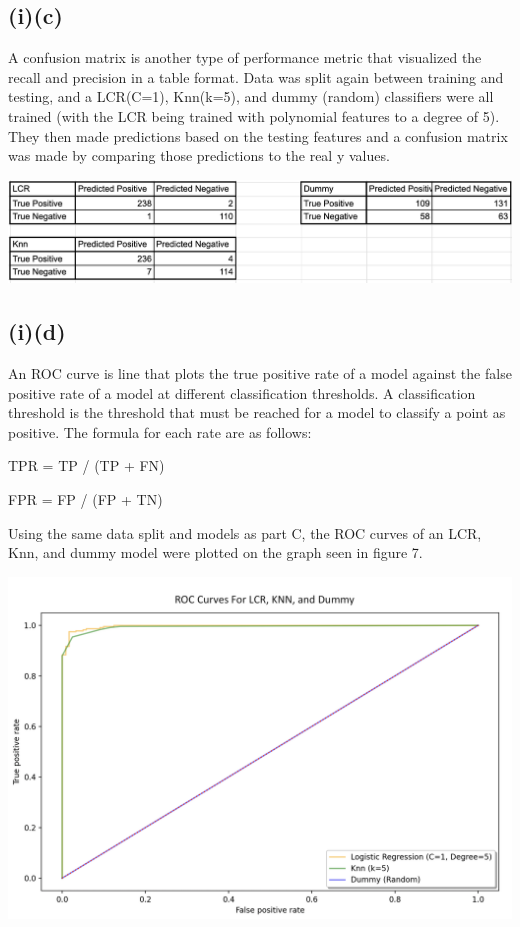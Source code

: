 \documentclass{article}
\begin{document}
\subsection{(i)(c)}
A confusion matrix is another type of performance metric that visualized the recall and precision in a table format. Data was split again between training and testing, and a LCR(C=1), Knn(k=5), and dummy (random) classifiers were all trained (with the LCR being trained with polynomial features to a degree of 5). They then made predictions based on the testing features and a confusion matrix was made by comparing those predictions to the real y values.

\begin{center}
\includegraphics[width=\linewidth]{confusion.png}
\end{center}

\subsection{(i)(d)}
An ROC curve is line that plots the true positive rate of a model against the false positive rate of a model at different classification thresholds. A classification threshold is the threshold that must be reached for a model to classify a point as positive. The formula for each rate are as follows:
\begin{center}
TPR = TP / (TP + FN)

FPR = FP / (FP + TN)
\end{center}

Using the same data split and models as part C, the ROC curves of an LCR, Knn, and dummy model were plotted on the graph seen in figure 7.

\begin{center}
\includegraphics[width=.8\linewidth]{roc.png}
\end{center}
\end{document}

